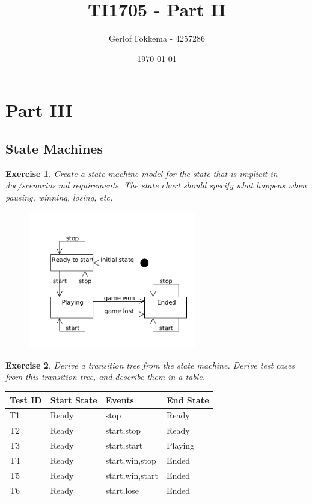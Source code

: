 \documentclass[a4paper]{article}
\title{TI1705 - Part II}
\author{Gerlof Fokkema - 4257286}
\date{\today}
\newtheorem{thm}{Exercise}
\begin{document}
  \maketitle
  \section{Part III}
  
  \subsection{State Machines}
    \begin{thm}
      Create a state machine model for the state that is implicit in \textit{doc/scenarios.md}
      requirements. The state chart should specify what happens when pausing, winning, losing, etc.
    \end{thm}
    \begin{figure}[htb]
      \includegraphics[height=6cm,keepaspectratio]{state}
    \end{figure}

    \begin{thm}
      Derive a transition tree from the state machine.
      Derive test cases from this transition tree, and describe them in a table.
    \end{thm}
    \begin{table}[h]
      \begin{tabular}{|l|l|l|l|}
        \hline
        Test ID & Start State & Events                                  & End State \\ \hline
        T1      & Ready       & stop                                    & Ready \\ \hline
        T2      & Ready       & start,stop                              & Ready \\ \hline
        T3      & Ready       & start,start                             & Playing \\ \hline
        T4      & Ready       & start,win,stop                          & Ended \\ \hline
        T5      & Ready       & start,win,start                         & Ended \\ \hline
        T6      & Ready       & start,lose                              & Ended \\ \hline
      \end{tabular}
    \end{table}
    
\end{document}
